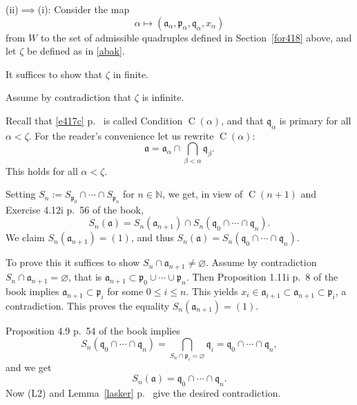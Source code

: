 \documentclass[parskip=half,fontsize=12pt]{scrartcl}%
\newcommand{\oo}{\operatorname}\newcommand{\ooo}{\operatorname*}
\newcommand{\mf}{\mathfrak}
\newcommand{\aaa}{\mf a}
\newcommand{\bbb}{\mf b}
\newcommand{\ppp}{\mf p}
\newcommand{\qqq}{\mf q}
\begin{document}
(ii)$\implies$(i): %
Consider the map 
$$
\alpha\mapsto(\aaa_\alpha,\ppp_\alpha,\qqq_\alpha,x_\alpha)
$$
from $W$ to the set of admissible quadruples defined in Section~\ref{for418} above, and let $\zeta$ be defined as in \eqref{abak}. 

It suffices to show that $\zeta$ in finite. 

Assume by contradiction that $\zeta$ is infinite.

Recall that \eqref{e417c} p.~\pageref{e417c} is called Condition $\oo C(\alpha)$, and that $\qqq_\alpha$ is primary for all $\alpha<\zeta$. For the reader's convenience let us rewrite $\oo C(\alpha)$:
$$
\aaa=\aaa_\alpha\cap\bigcap_{\beta<\alpha}\qqq_\beta.
$$ 
This holds for all $\alpha<\zeta$.

Setting $S_n:=S_{\ppp_0}\cap\cdots\cap S_{\ppp_n}$ for $n\in\mathbb N$, we get, in view of $\oo C(n+1)$ and Exercise 4.12i p.~56 of the book,
$$
S_n(\aaa)=S_n(\aaa_{n+1})\cap S_n(\qqq_0\cap\cdots\cap\qqq_n).
$$ 
We claim $S_n(\aaa_{n+1})=(1)$, and thus $S_n(\aaa)=S_n(\qqq_0\cap\cdots\cap\qqq_n)$.

To prove this it suffices to show $S_n\cap\aaa_{n+1}\ne\varnothing$. Assume by contradiction $S_n\cap\aaa_{n+1}=\varnothing$, that is $\aaa_{n+1}\subset\ppp_0\cup\cdots\cup\ppp_n$. Then Proposition 1.11i p.~8 of the book implies $\aaa_{n+1}\subset\ppp_i$ for some $0\le i\le n$. This yields $x_i\in\aaa_{i+1}\subset\aaa_{n+1}\subset\ppp_i$, a contradiction. This proves the equality $S_n(\aaa_{n+1})=(1)$.

Proposition 4.9 p.~54 of the book implies 
$$
S_n(\qqq_0\cap\cdots\cap\qqq_n)=\bigcap_{S_n\cap\ppp_i=\varnothing}\qqq_i=\qqq_0\cap\cdots\cap\qqq_n,
$$ 
and we get
$$
S_n(\aaa)=\qqq_0\cap\cdots\cap\qqq_n.
$$ 
Now (L2) and Lemma~\ref{lasker} p.~\pageref{lasker} give the desired contradiction.
\end{document}
